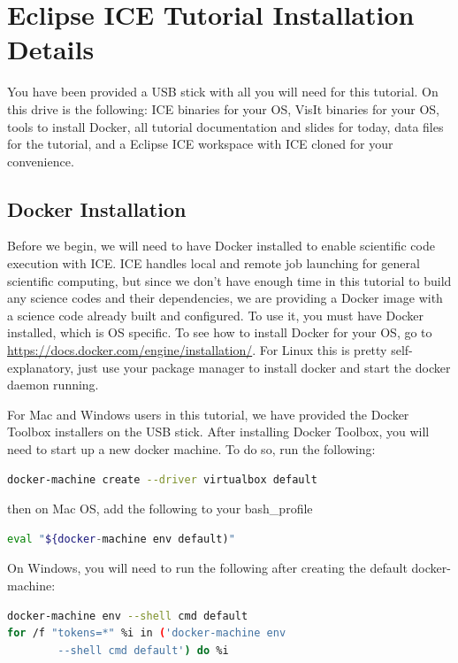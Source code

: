 \documentclass{article}
\begin{document}
\section*{Eclipse ICE Tutorial Installation Details}
You have been provided a USB stick with all you will need for this tutorial. On
this drive is the following: ICE binaries for your OS, VisIt binaries for your
OS, tools to install Docker, all tutorial documentation and slides for today,
data files for the tutorial, and a Eclipse ICE workspace with ICE cloned for
your convenience. 

\subsection*{Docker Installation}
Before we begin, we will need to have Docker installed to enable scientific code
execution with ICE. ICE handles local and remote job launching for general
scientific computing, but since we don't have enough time in this tutorial to
build any science codes and their dependencies, we are providing a Docker image
with a science code already built and configured. To use it, you must have
Docker installed, which is OS specific. To see how to install Docker for your
OS, go to \url{https://docs.docker.com/engine/installation/}. For Linux this
is pretty self-explanatory, just use your package manager to install docker
and start the docker daemon running. 

For Mac and Windows users in this tutorial,
we have provided the Docker Toolbox installers on the USB stick. After
installing Docker Toolbox, you will need to start up a new docker machine. To do so, run the following:
\begin{lstlisting}[language=bash]
docker-machine create --driver virtualbox default
\end{lstlisting}
then on Mac OS, add the following to your bash\_profile
\begin{lstlisting}[language=bash]
eval "${docker-machine env default)"
\end{lstlisting}
On Windows, you will need to run the following after creating the default
docker-machine:
\begin{lstlisting}[language=bash]
docker-machine env --shell cmd default
for /f "tokens=*" %i in ('docker-machine env 
		--shell cmd default') do %i
\end{lstlisting}
\end{document}
